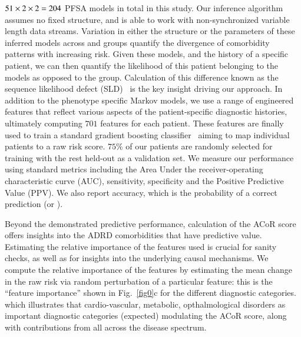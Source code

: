 \documentclass[onecolumn, compsoc,11pt]{IEEEtran}
\makeatletter
\renewcommand\subsection{\@startsection {subsection}{2}{\z@}%
                                   {0ex \@plus -1.75ex \@minus -1.2ex}%
                                   {0ex \@plus.0ex}%
                                   {\fontsize{11}{11}\selectfont\bfseries\sffamily\color{black}}}
\def\DXphn{51}%
\def\numfeatures{701\xspace}%
\def\acor{ACoR\xspace}
\makeatother
\begin{document}
$\DXphn\times 2 \times 2  = \the\numexpr  \DXphn  *2 *2  \relax$  PFSA models in total in this study. Our inference algorithm  assumes no fixed structure, and is able to work with non-synchronized variable length data streams. Variation in either the structure or the parameters of these inferred models across \treatment and \control groups  quantify the divergence of comorbidity patterns with increasing risk. Given these models, and  the history of a specific patient, we can then quantify the likelihood of this patient belonging to the \control  models as opposed to the \treatment group. Calculation of   this difference known as the sequence likelihood defect (SLD)~\cite{huang2019data} is the key insight driving our approach. In addition to the phenotype specific Markov models, we use a range of engineered features that reflect various aspects of the patient-specific diagnostic histories, ultimately computing   $\numfeatures$  features    for each patient. These features are finally used to train a standard gradient boosting classifier~\cite{ke2017lightgbm} aiming to  map   individual patients  to a raw risk score. $75\%$ of our patients are randomly selected for training with the rest  held-out as a validation set. We measure our performance using  standard metrics including the Area Under the receiver-operating characteristic curve (AUC), sensitivity, specificity and the Positive Predictive Value (PPV). We also report accuracy, which is the probability  of a  correct prediction (\treatment or \control).

Beyond the demonstrated predictive performance, calculation of the \acor score offers  insights into the ADRD comorbidities  that  have predictive value. Estimating the relative importance of the features used is crucial for  sanity checks, as well as  for insights into the underlying causal mechanisms. We compute the relative importance of the features  by estimating the  mean change in the raw risk via random perturbation of a particular feature: this is the ``feature importance'' shown in Fig.~\ref{fig0}c for the different diagnostic categories.  which  illustrates that cardio-vascular, metabolic, opthalmological  disorders as  important diagnostic categories (expected) modulating the \acor score, along with contributions from all across the disease spectrum.
\end{document}
